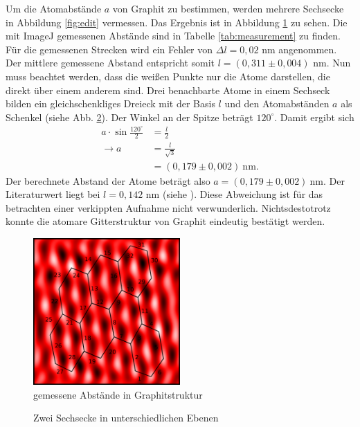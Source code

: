 Um die Atomabstände $a$ von Graphit zu bestimmen, werden mehrere Sechsecke in Abbildung \ref{fig:edit} vermessen. Das Ergebnis ist in Abbildung \ref{fig:measurement} zu sehen. Die mit ImageJ gemessenen Abstände sind in Tabelle \ref{tab:measurement} zu finden. Für die gemessenen Strecken wird ein Fehler von $\Delta l=0,02$ nm angenommen. Der mittlere gemessene Abstand entspricht somit $l=(0,311 \pm 0,004)$ nm. 
Nun muss beachtet werden, dass die weißen Punkte nur die Atome darstellen, die direkt über einem anderem sind. Drei benachbarte Atome in einem Sechseck bilden ein gleichschenkliges Dreieck mit der Basis $l$ und den Atomabständen $a$ als Schenkel (siehe Abb. \ref{fig:triangle}). Der Winkel an der Spitze beträgt $120^\circ$. Damit ergibt sich
\begin{align*}
a\cdot\sin{\frac{120^\circ}{2}} &= \frac{l}{2}\\
\rightarrow a &= \frac{l}{\sqrt{3}}\\
  &= (0,179 \pm 0,002) \ \mathrm{nm}.
\end{align*} Der berechnete Abstand der Atome beträgt also $a = (0,179 \pm 0,002) \ \si{\nano\metre}$. Der Literaturwert liegt bei $l=0,142$ nm (siehe \cite{graphit}). Diese Abweichung ist für das betrachten einer verkippten Aufnahme nicht verwunderlich. Nichtsdestotrotz konnte die atomare Gitterstruktur von Graphit eindeutig bestätigt werden.

\newpage

\begin{figure}[h]
  \centering
  \includegraphics[width=0.5\textwidth]{data/graphit_kilian/measurement_final.png}
  \caption{gemessene Abstände in Graphitstruktur}
  \label{fig:measurement}
\end{figure}

\begin{figure}[h]
\centering

\caption{Zwei Sechsecke in unterschiedlichen Ebenen}
\label{fig:triangle}
\end{figure}


